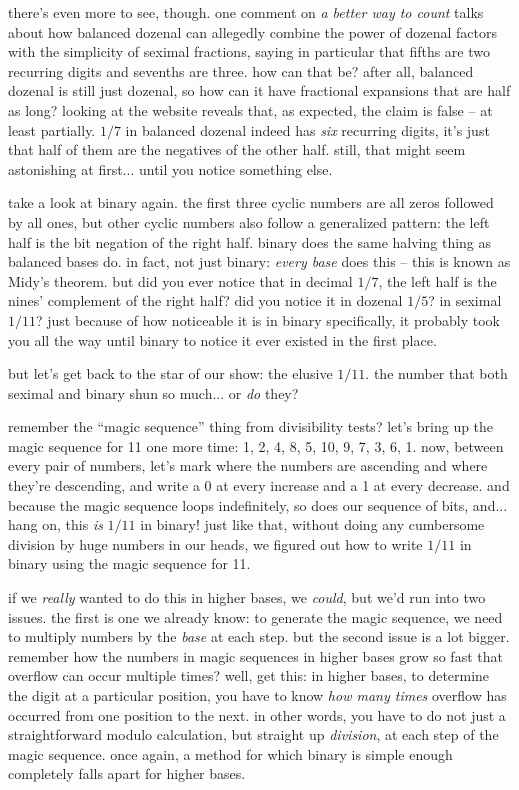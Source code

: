 \documentclass[../best.tex]{subfiles}
\begin{document}
there's even more to see, though. one comment on {\it a better way to count} talks about how balanced dozenal can allegedly combine the power of dozenal factors with the simplicity of seximal fractions, saying in particular that fifths are two recurring digits and sevenths are three.\myfootnote{} how can that be? after all, balanced dozenal is still just dozenal, so how can it have fractional expansions that are half as long? looking at the website reveals that, as expected, the claim is false -- at least partially. $1/7$ in balanced dozenal indeed has \emph{six} recurring digits, it's just that half of them are the negatives of the other half. still, that might seem astonishing at first... until you notice something else.

take a look at binary again. the first three cyclic numbers are all zeros followed by all ones, but other cyclic numbers also follow a generalized pattern: the left half is the bit negation of the right half. binary does the same halving thing as balanced bases do.\myfootnote{} in fact, not just binary: \emph{every base} does this -- this is known as Midy's theorem.\myfootnote{} but did you ever notice that in decimal $1/7$, the left half is the nines' complement of the right half? did you notice it in dozenal $1/5$? in seximal $1/11$? just because of how noticeable it is in binary specifically, it probably took you all the way until binary to notice it ever existed in the first place.\myfootnote{}

but let's get back to the star of our show: the elusive $1/11$. the number that both seximal and binary shun so much... or \emph{do} they?

remember the ``magic sequence'' thing from divisibility tests? let's bring up the magic sequence for 11 one more time: 1, 2, 4, 8, 5, 10, 9, 7, 3, 6, 1. now, between every pair of numbers, let's mark where the numbers are ascending and where they're descending, and write a 0 at every increase and a 1 at every decrease. and because the magic sequence loops indefinitely, so does our sequence of bits, and... hang on, this \emph{is} $1/11$ in binary!\myfootnote{} just like that, without doing any cumbersome division by huge numbers in our heads, we figured out how to write $1/11$ in binary using the magic sequence for 11.\myfootnote{}

if we \emph{really} wanted to do this in higher bases, we \emph{could}, but we'd run into two issues. the first is one we already know: to generate the magic sequence, we need to multiply numbers by the \emph{base} at each step. but the second issue is a lot bigger. remember how the numbers in magic sequences in higher bases grow so fast that overflow can occur multiple times? well, get this: in higher bases, to determine the digit at a particular position, you have to know \emph{how many times} overflow has occurred from one position to the next. in other words, you have to do not just a straightforward modulo calculation, but straight up \emph{division}, at each step of the magic sequence. once again, a method for which binary is simple enough completely falls apart for higher bases.\myfootnote{}
\end{document}
